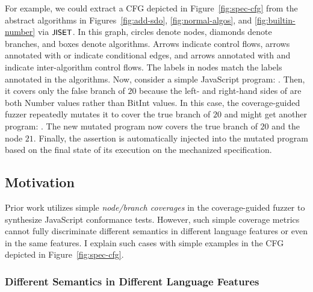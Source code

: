 
For example, we could extract a CFG depicted in Figure~\ref{fig:spec-cfg} from
the abstract algorithms in Figures~\ref{fig:add-sdo}, \ref{fig:normal-algos},
and \ref{fig:builtin-number} via $\textsf{\small JISET}$.
%
In this graph, circles denote nodes, diamonds denote branches, and boxes denote
algorithms.
%
Arrows indicate control flows, arrows annotated with  or 
indicate conditional edges, and arrows annotated with  and 
indicate inter-algorithm control flows.
%
The labels in nodes match the labels annotated in the algorithms.
%
Now, consider a simple JavaScript program: .
%
Then, it covers only the false branch of $20$ because the left- and right-hand
sides of  are both Number values rather than BitInt values.
%
In this case, the coverage-guided fuzzer repeatedly mutates it to cover the true
branch of $20$ and might get another program: .
%
The new mutated program now covers the true branch of $20$ and the node $21$.
%
Finally, the assertion  is automatically injected into
the mutated program based on the final state of its execution on the mechanized
specification.




\subsection{Motivation}

Prior work utilizes simple \textit{node/branch coverages} in the coverage-guided
fuzzer to synthesize JavaScript conformance tests.
%
However, such simple coverage metrics cannot fully discriminate different
semantics in different language features or even in the same features.
%
I explain such cases with simple examples in the CFG depicted in
Figure~\ref{fig:spec-cfg}.




\subsubsection{Different Semantics in Different Language Features}

